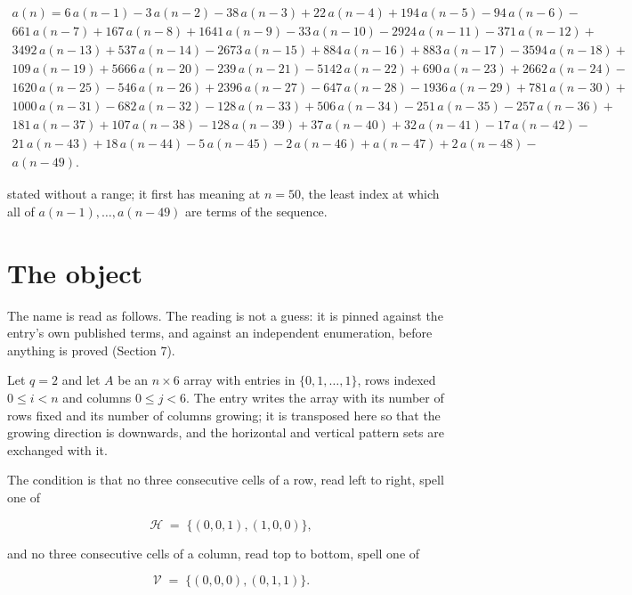 \documentclass[11pt]{article}
\theoremstyle{definition}
\begin{document}
\begin{multline*} a(n) = 6\,a(n-1) - 3\,a(n-2) - 38\,a(n-3) + 22\,a(n-4) + 194\,a(n-5) - 94\,a(n-6) - \\ 661\,a(n-7) + 167\,a(n-8) + 1641\,a(n-9) - 33\,a(n-10) - 2924\,a(n-11) - 371\,a(n-12) + \\ 3492\,a(n-13) + 537\,a(n-14) - 2673\,a(n-15) + 884\,a(n-16) + 883\,a(n-17) - 3594\,a(n-18) + \\ 109\,a(n-19) + 5666\,a(n-20) - 239\,a(n-21) - 5142\,a(n-22) + 690\,a(n-23) + 2662\,a(n-24) - \\ 1620\,a(n-25) - 546\,a(n-26) + 2396\,a(n-27) - 647\,a(n-28) - 1936\,a(n-29) + 781\,a(n-30) + \\ 1000\,a(n-31) - 682\,a(n-32) - 128\,a(n-33) + 506\,a(n-34) - 251\,a(n-35) - 257\,a(n-36) + \\ 181\,a(n-37) + 107\,a(n-38) - 128\,a(n-39) + 37\,a(n-40) + 32\,a(n-41) - 17\,a(n-42) - \\ 21\,a(n-43) + 18\,a(n-44) - 5\,a(n-45) - 2\,a(n-46) + a(n-47) + 2\,a(n-48) - \\ a(n-49). \end{multline*}

stated without a range; it first has meaning at $n = 50$, the least index at which all of $a(n-1),\dots,a(n-49)$ are terms of the sequence.

\section{The object}

The name is read as follows. The reading is not a guess: it is pinned against the entry's own published terms, and against an independent enumeration, before anything is proved (Section 7).

Let $q = 2$ and let $A$ be an $n \times 6$ array with entries in $\{0,1,\dots,1\}$, rows indexed $0 \le i < n$ and columns $0 \le j < 6$. The entry writes the array with its number of rows fixed and its number of columns growing; it is transposed here so that the growing direction is downwards, and the horizontal and vertical pattern sets are exchanged with it.

The condition is that no three consecutive cells of a row, read left to right, spell one of

\[\mathcal{H} \;=\; \{(0,0,1), (1,0,0)\},\]

and no three consecutive cells of a column, read top to bottom, spell one of

\[\mathcal{V} \;=\; \{(0,0,0), (0,1,1)\}.\]
\end{document}
